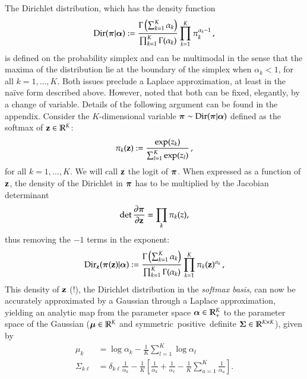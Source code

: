 The Dirichlet distribution, which has the density function
%
\begin{equation}\label{eq:dirichlet}
    \mathrm{Dir}(\boldsymbol{\pi} | {\boldsymbol{\alpha}}) := \frac{\Gamma \left( \sum_{k=1}^K \alpha_k \right)}{\prod_{k=1}^K \Gamma(\alpha_k)} \prod_{k=1}^K \pi_k^{\alpha_k-1} \, ,
\end{equation}
%
is defined on the probability simplex and can be multimodal in the sense that the maxima of the distribution lie at the boundary of the simplex when $\alpha_k < 1$, for all $k = 1, \dots, K$. Both issues preclude a Laplace approximation, at least in the na\"ive form described above. However, \citet{MacKay1998} noted that both can be fixed, elegantly, by a change of variable. Details of the following argument can be found in the appendix. Consider the $K$-dimensional variable $\boldsymbol{\pi} \sim \mathrm{Dir}(\boldsymbol{\pi} | {\boldsymbol{\alpha}})$ defined as the softmax of $\mathbf{z}\in\mathbb{R}^K$:
\begin{equation}
    \pi_k(\mathbf{z}) := \frac{\exp(z_k)}{\sum_{l=1}^K \exp(z_l)} \, ,
\end{equation}
%
for all $k = 1, \dots, K$. We will call $\mathbf{z}$ the logit of $\boldsymbol{\pi}$. When expressed as a function of $\mathbf{z}$, the density of the Dirichlet in $\boldsymbol{\pi}$ has to be multiplied by the Jacobian determinant
\begin{equation}
    \det \frac{\partial \boldsymbol{\pi}}{\partial \mathbf{z}}  = \prod_k \pi_k(z),
\end{equation}
thus removing the $-1$ terms in the exponent: %
\begin{equation}\label{eq:dirichlet_softmax}
    \mathrm{Dir}_{\mathbf{z}}(\boldsymbol{\pi}(\mathbf{z}) | {\boldsymbol{\alpha}}) := \frac{\Gamma \left( \sum_{k=1}^K \alpha_k \right)}{\prod_{k=1}^K \Gamma(\alpha_k)} \prod_{k=1}^K \pi_k(\mathbf{z})^{\alpha_k} \, ,
\end{equation}
This density of $\mathbf{z}$ (!), the Dirichlet distribution in the \emph{softmax basis}, can now be accurately approximated by a Gaussian through a Laplace approximation, yielding an analytic map from the parameter space ${\boldsymbol{\alpha}}\in\mathbb{R}_+ ^K$ to the parameter space of the Gaussian (${\boldsymbol{\mu}} \in\mathbb{R}^K$ and symmetric~positive~definite ${\boldsymbol{\Sigma}}\in\mathbb{R}^{K\times K}$), given by
\begin{align}
\mu_k &= \log \alpha_k  - \frac{1}{K} \sum_{l=1}^{K} \log \alpha_l \label{eq:mubridge}\\
\Sigma_{k\ell} &= \delta_{k\ell}\frac{1}{\alpha_k} - \frac{1}{K}\left[\frac{1}{\alpha_k} + \frac{1}{\alpha_\ell} - \frac{1}{K}\sum_{u=1} ^K \frac{1}{\alpha_u} \right]. \label{eq:Sigmabridge}
\end{align}
